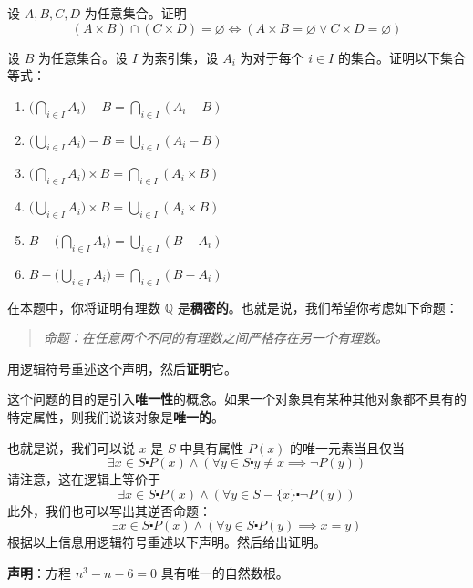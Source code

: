 \begin{exercise}
    设 $A, B, C, D$ 为任意集合。证明
    \[(A \times B) \cap (C \times D) = \varnothing \iff (A \times B = \varnothing \lor C \times D = \varnothing) \]
\end{exercise}

\begin{exercise}
    设 $B$ 为任意集合。设 $I$ 为索引集，设 $A_i$ 为对于每个 $i \in I$ 的集合。证明以下集合等式：

    \begin{enumerate}[label=(\alph*)]
        \item $\displaystyle \Bigg(\bigcap_{i \in I} A_i \Bigg) - B = \bigcap_{i \in I} (A_i - B)$
        \item $\displaystyle \Bigg(\bigcup_{i \in I} A_i \Bigg) - B = \bigcup_{i \in I} (A_i - B)$
        \item $\displaystyle \Bigg(\bigcap_{i \in I} A_i \Bigg) \times B = \bigcap_{i \in I} (A_i \times B)$
        \item $\displaystyle \Bigg(\bigcup_{i \in I} A_i \Bigg) \times B = \bigcup_{i \in I} (A_i \times B)$
        \item $\displaystyle B - \Bigg(\bigcap_{i \in I} A_i \Bigg) = \bigcup_{i \in I} (B - A_i)$
        \item $\displaystyle B - \Bigg(\bigcup_{i \in I} A_i \Bigg) = \bigcap_{i \in I} (B - A_i)$
    \end{enumerate}  
\end{exercise}

\begin{exercise}\label{exc:exercises4.11.26}
    在本题中，你将证明有理数 $\mathbb{Q}$ 是\textbf{稠密的}。也就是说，我们希望你考虑如下命题：

    \begin{quote}
        \emph{命题：在任意两个不同的有理数之间严格存在另一个有理数。}
    \end{quote}
    用逻辑符号重述这个声明，然后\textbf{证明}它。
\end{exercise}

\begin{exercise}
    这个问题的目的是引入\textbf{唯一性}的概念。如果一个对象具有某种其他对象都不具有的特定属性，则我们说该对象是\textbf{唯一的}。

    也就是说，我们可以说 $x$ 是 $S$ 中具有属性 $P(x)$ 的唯一元素当且仅当
    \[\exists x \in S \centerdot P(x) \land (\forall y \in S \centerdot y \ne x \implies \neg P(y))\]
    请注意，这在逻辑上等价于
    \[\exists x \in S \centerdot P(x) \land (\forall y \in S - \{x\} \centerdot \neg P(y))\]
    此外，我们也可以写出其逆否命题：
    \[\exists x \in S \centerdot P(x) \land (\forall y \in S \centerdot P(y) \implies x = y)\]
    根据以上信息用逻辑符号重述以下声明。然后给出证明。

    \textbf{声明}：方程 $n^3 - n - 6 = 0$ 具有唯一的自然数根。
\end{exercise}


